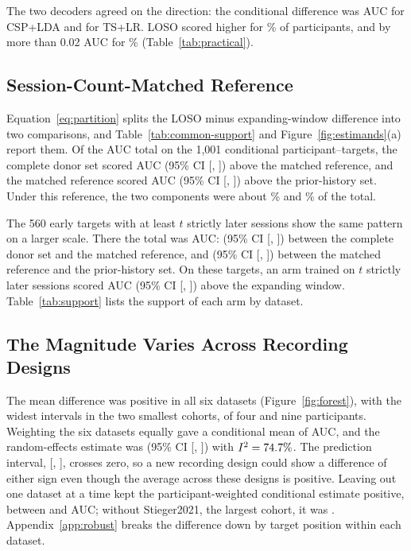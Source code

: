 \documentclass{ieeeaccess}
\begin{document}


The two decoders agreed on the direction: the conditional difference was
\CSPGapMean{} AUC for CSP+LDA and \TSGapMean{} for TS+LR. LOSO scored higher for
\CondPositive\% of participants, and by more than 0.02 AUC for \CondGtTwo\%
(Table~\ref{tab:practical}).

\subsection{Session-Count-Matched Reference}
\label{sec:partition}
Equation~\eqref{eq:partition} splits the LOSO minus expanding-window difference
into two comparisons, and Table~\ref{tab:common-support} and
Figure~\ref{fig:estimands}(a) report them. Of the \UniformTotalMean{} AUC total on the
1,001 conditional participant--targets, the complete donor set scored
\UniformCountMeanUnsigned{} AUC (95\% CI [\UniformCountLoUnsigned{},
\UniformCountHiUnsigned{}]) above the matched reference, and the matched
reference scored \UniformCompositionMeanUnsigned{} AUC (95\% CI
[\UniformCompositionLoUnsigned{}, \UniformCompositionHiUnsigned{}]) above the
prior-history set. Under this reference,
the two components were about \CondCountShare\% and \CondCompShare\% of the
total.

The 560 early targets with at least $t$ strictly later sessions show the same
pattern on a larger scale. There the total was \StrictTotalMean{} AUC:
\StrictCountMean{} (95\% CI [\StrictCountLo{}, \StrictCountHi{}]) between the
complete donor set and the matched reference, and \StrictCompositionMean{}
(95\% CI [\StrictCompositionLo{}, \StrictCompositionHi{}]) between the matched
reference and the prior-history set. On these targets, an arm trained on $t$ strictly later
sessions scored \StrictFutureMeanUnsigned{} AUC (95\% CI
[\StrictFutureLoUnsigned{}, \StrictFutureHiUnsigned{}]) above the expanding
window. Table~\ref{tab:support} lists
the support of each arm by dataset.




\subsection{The Magnitude Varies Across Recording Designs}
The mean difference was positive in all six datasets (Figure~\ref{fig:forest}),
with the widest intervals in the two smallest cohorts, of four and nine
participants.
Weighting the six datasets equally gave a conditional mean of \DatasetMean{}
AUC, and the random-effects estimate was \MetaMean{} (95\% CI [\MetaLo{},
\MetaHi{}]) with $I^2=74.7\%$. The prediction interval, [\MetaPredLo{},
\MetaPredHi{}], crosses zero, so a new recording design could show a difference
of either sign even though the average across these designs is positive.
Leaving out one dataset at a time kept the participant-weighted conditional
estimate positive, between \LoDOCondMin{} and \LoDOCondMax{} AUC; without
Stieger2021, the largest cohort, it was \LoDOWithoutStiegerCond{}. Appendix~\ref{app:robust}
breaks the difference down by target position within each dataset.
\end{document}
